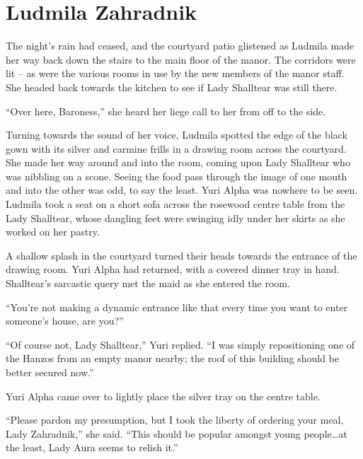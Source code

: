 \chapter{Ludmila Zahradnik}

The night’s rain had ceased, and the courtyard patio glistened as Ludmila made her way back down the stairs to the main floor of the manor. The corridors were lit – as were the various rooms in use by the new members of the manor staff. She headed back towards the kitchen to see if Lady Shalltear was still there.

 

“Over here, Baroness,” she heard her liege call to her from off to the side.

 

Turning towards the sound of her voice, Ludmila spotted the edge of the black gown with its silver and carmine frills in a drawing room across the courtyard. She made her way around and into the room, coming upon Lady Shalltear who was nibbling on a scone. Seeing the food pass through the image of one mouth and into the other was odd, to say the least. Yuri Alpha was nowhere to be seen. Ludmila took a seat on a short sofa across the rosewood centre table from the Lady Shalltear, whose dangling feet were swinging idly under her skirts as she worked on her pastry.

 

A shallow splash in the courtyard turned their heads towards the entrance of the drawing room. Yuri Alpha had returned, with a covered dinner tray in hand. Shalltear’s sarcastic query met the maid as she entered the room.

 

“You’re not making a dynamic entrance like that every time you want to enter someone’s house, are you?”

 

“Of course not, Lady Shalltear,” Yuri replied. “I was simply repositioning one of the Hanzos from an empty manor nearby; the roof of this building should be better secured now.”

 

Yuri Alpha came over to lightly place the silver tray on the centre table.

 

“Please pardon my presumption, but I took the liberty of ordering your meal, Lady Zahradnik,” she said. “This should be popular amongst young people…at the least, Lady Aura seems to relish it.”

 

